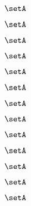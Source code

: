 \begin{forslides}
    \begin{equation}
        \label{eq:slides-processes-126}
        \setA
    \end{equation}

    \begin{equation}
        \label{eq:slides-processes-127}
        \setA
    \end{equation}

    \begin{equation}
        \label{eq:slides-processes-128}
        \setA
    \end{equation}

    \begin{equation}
        \label{eq:slides-processes-129}
        \setA
    \end{equation}

    \begin{equation}
        \label{eq:slides-processes-130}
        \setA
    \end{equation}

    \begin{equation}
        \label{eq:slides-processes-131}
        \setA
    \end{equation}

    \begin{equation}
        \label{eq:slides-processes-132}
        \setA
    \end{equation}

    \begin{equation}
        \label{eq:slides-processes-133}
        \setA
    \end{equation}

    \begin{equation}
        \label{eq:slides-processes-134}
        \setA
    \end{equation}

    \begin{equation}
        \label{eq:slides-processes-135}
        \setA
    \end{equation}

    \begin{equation}
        \label{eq:slides-processes-136}
        \setA
    \end{equation}

    \begin{equation}
        \label{eq:slides-processes-137}
        \setA
    \end{equation}

    \begin{equation}
        \label{eq:slides-processes-138}
        \setA
    \end{equation}


\end{forslides}
